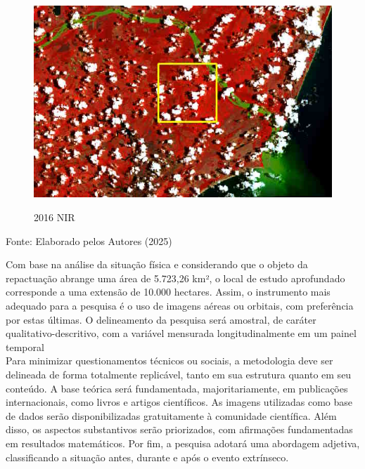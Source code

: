 			\begin{minipage}[t!]{0.33\textwidth}
				\begin{figure}[H]
					\centering \small \caption{2016 NIR}
					\includegraphics[width=0.97\linewidth]{FIGURAS/lama1red}
					\label{fig:indao3} 
				\end{figure}					
			\end{minipage} 
			\begin{center}
				Fonte:   Elaborado pelos Autores (2025)
			\end{center}

  \hspace*{1.25 cm} Com base na análise da situação física e considerando que o objeto da repactuação abrange uma área de 5.723,26 km², o local de estudo aprofundado corresponde a uma extensão de 10.000 hectares. Assim, o instrumento mais adequado para a pesquisa é o uso de imagens aéreas ou orbitais, com preferência por estas últimas. O delineamento da pesquisa será amostral, de caráter qualitativo-descritivo, com a variável mensurada longitudinalmente em um painel temporal\\
    \hspace*{1.25 cm} Para minimizar questionamentos técnicos ou sociais, a metodologia deve ser delineada de forma totalmente replicável, tanto em sua estrutura quanto em seu conteúdo. A base teórica será fundamentada, majoritariamente, em publicações internacionais, como livros e artigos científicos. As imagens utilizadas como base de dados serão disponibilizadas gratuitamente à comunidade científica. Além disso, os aspectos substantivos serão priorizados, com afirmações fundamentadas em resultados matemáticos. Por fim, a pesquisa adotará uma abordagem adjetiva, classificando a situação antes, durante e após o evento extrínseco.

